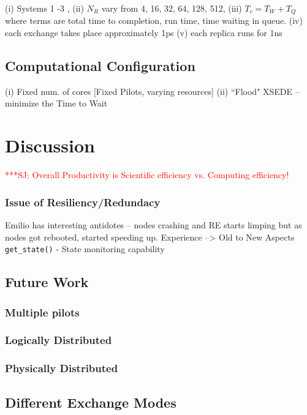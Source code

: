 \documentclass{sig-alternate}
\newcommand{\jhanote}[1]{ {\textcolor{red} { ***SJ: #1 }}}
\newcommand{\jhanote}[1]{}
\begin{document}
(i) Systems 1 -3 , (ii) $N_R$ vary from 4, 16, 32, 64, 128, 512, (iii)
$T_c = T_W + T_Q$ where terms are total time to completion, run time,
time waiting in queue.  (iv) each exchange takes place approximately
1ps (v) each replica runs for 1ns


\subsection{Computational Configuration}
(i) Fixed num. of cores [Fixed Pilots, varying resources] (ii) ``Flood"
XSEDE -- minimize the Time to Wait

\section{Discussion}

\jhanote{Overall Productivity is Scientific efficiency vs. Computing
  efficiency!}

\subsubsection{Issue of Resiliency/Redundacy} Emilio has interesting
antidotes -- nodes crashing and RE starts limping but as nodes got
rebooted, started speeding up.  Experience --> Old to New Aspects
\texttt{get\_state()} - State monitoring capability


\subsection{Future Work}

\subsubsection{Multiple pilots}

\subsubsection{Logically Distributed}
\subsubsection{Physically Distributed}

\subsection{Different Exchange Modes}
\end{document}
